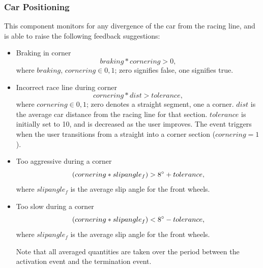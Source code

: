 \subsubsection{Car Positioning}
This component monitors for any divergence of the car from the racing line, and is able to raise the following feedback suggestions:
\begin{itemize}
	\item Braking in corner
	\begin{equation}
		braking * cornering > 0,
	\end{equation}
	where $braking$, $cornering \in {0,1}$; zero signifies false, one signifies true. 
	\item Incorrect race line during corner
	\begin{equation}
		cornering * dist > tolerance,
	\end{equation}
	where $cornering \in {0,1}$; zero denotes a straight segment, one a corner. $dist$ is the average car distance from the racing line for that section. $tolerance$ is initially set to 10, and is decreased as the user improves. The event triggers when the user transitions from a straight into a corner section ($cornering = 1$).
	\item Too aggressive during a corner
	\begin{equation}
		(cornering * slipangle_f) > 8\degree + tolerance,
	\end{equation}
	where $slipangle_f$ is the average slip angle for the front wheels.
	\item Too slow during a corner
	\begin{equation}
		(cornering * slipangle_f) < 8\degree - tolerance,
	\end{equation}
	where $slipangle_f$ is the average slip angle for the front wheels.
	
	Note that all averaged quantities are taken over the period between the activation event and the termination event.	
\end{itemize}

